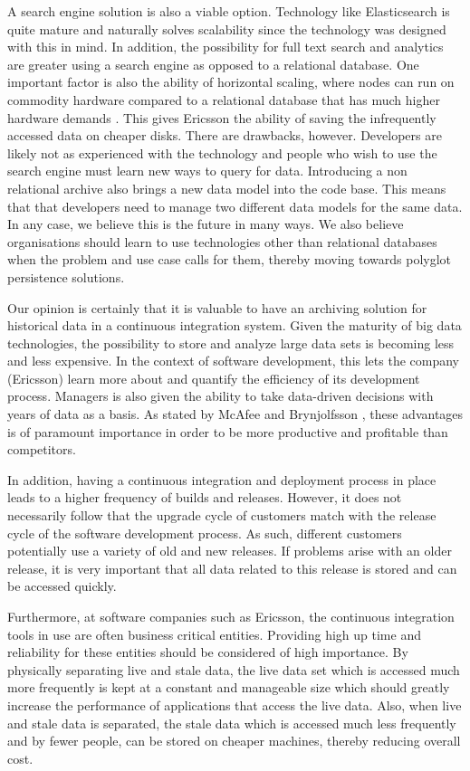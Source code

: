 A search engine solution is also a viable option. Technology like Elasticsearch is quite mature and naturally solves scalability since the technology was designed with this in mind. In addition, the possibility for full text search and analytics are greater using a search engine as opposed to a relational database. One important factor is also the ability of horizontal scaling, where nodes can run on commodity hardware compared to a relational database that has much higher hardware demands \cite{NoSQLERA}. This gives Ericsson the ability of saving the infrequently accessed data on cheaper disks. There are drawbacks, however. Developers are likely not as experienced with the technology and people who wish to use the search engine must learn new ways to query for data. Introducing a non relational archive also brings a new data model into the code base. This means that that developers need to manage two different data models for the same data. In any case, we believe this is the future in many ways. We also believe organisations should learn to use technologies other than relational databases when the problem and use case calls for them, thereby moving towards polyglot persistence solutions.

Our opinion is certainly that it is valuable to have an archiving solution for historical data in a continuous integration system. Given the maturity of big data technologies, the possibility to store and analyze large data sets is becoming less and less expensive. In the context of software development, this lets the company (Ericsson) learn more about and quantify the efficiency of its development process. Managers is also given the ability to take data-driven decisions with years of data as a basis. As stated by McAfee and Brynjolfsson \cite{bigDataMane}, these advantages is of paramount importance in order to be more productive and profitable than competitors.

In addition, having a continuous integration and deployment process in place leads to a higher frequency of builds and releases. However, it does not necessarily follow that the upgrade cycle of customers match with the release cycle of the software development process. As such, different customers potentially use a variety of old and new releases. If problems arise with an older release, it is very important that all data related to this release is stored and can be accessed quickly.

Furthermore, at software companies such as Ericsson, the continuous integration tools in use are often business critical entities. Providing high up time and reliability for these entities should be considered of high importance. By physically separating live and stale data, the live data set which is accessed much more frequently is kept at a constant and manageable size which should greatly increase the performance of applications that access the live data. Also, when live and stale data is separated, the stale data which is accessed much less frequently and by fewer people, can be stored on cheaper machines, thereby reducing overall cost.

